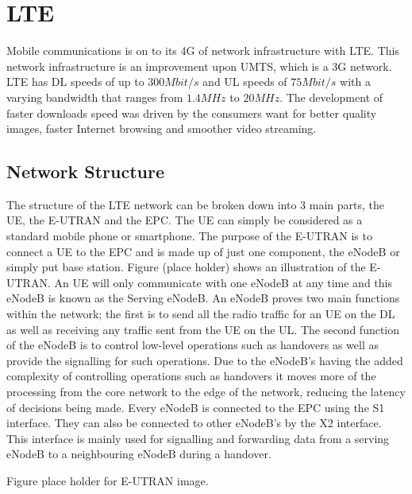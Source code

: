 \chapter{LTE}\label{lte}
Mobile communications is on to its \ac{4G} of network infrastructure with \ac{LTE}. This network infrastructure is an improvement upon \ac{UMTS}, which is a \ac{3G} network. \ac{LTE} has \ac{DL} speeds of up to $300 Mbit/s$ and \ac{UL} speeds of $75 Mbit/s$ with a varying bandwidth that ranges from $1.4 MHz$ to $20 MHz$. The development of faster downloads speed was driven by the consumers want for better quality images, faster Internet browsing and smoother video streaming.~\cite{cox2012introduction}

\section{Network Structure}\label{network structure}
The structure of the LTE network can be broken down into 3 main parts, the \ac{UE}, the \ac{E-UTRAN} and the \ac{EPC}. The UE can simply be considered as a standard mobile phone or smartphone. The purpose of the E-UTRAN is to connect a UE to the EPC and is made up of just one component, the \ac{eNodeB} or simply put base station. Figure (place holder) shows an illustration of the E-UTRAN. An UE will only communicate with one eNodeB at any time and this eNodeB is known as the Serving eNodeB. An eNodeB proves two main functions within the network; the first is to send all the radio traffic for an UE on the DL as well as receiving any traffic sent from the UE on the UL. The second function of the eNodeB is to control low-level operations such as handovers as well as provide the signalling for such operations. Due to the eNodeB's having the added complexity of controlling operations such as handovers it moves more of the processing from the core network to the edge of the network, reducing the latency of decisions being made. Every eNodeB is connected to the EPC using the S1 interface. They can also be connected to other eNodeB's by the X2 interface. This interface is mainly used for signalling and forwarding data from a serving eNodeB to a neighbouring eNodeB during a handover.

Figure place holder for E-UTRAN image.

